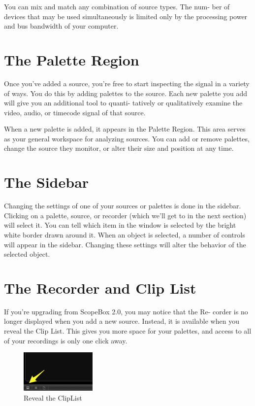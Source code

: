 \documentclass[10,letterpaper,]{report}
\begin{document}
You can mix and match any combination of source types. The num- ber of
devices that may be used simultaneously is limited only by the
processing power and bus bandwidth of your computer.

\section{The Palette Region}

Once you've added a source, you're free to start inspecting the signal
in a variety of ways. You do this by adding palettes to the source. Each
new palette you add will give you an additional tool to quanti- tatively
or qualitatively examine the video, audio, or timecode signal of that
source.

When a new palette is added, it appears in the Palette Region. This area
serves as your general workspace for analyzing sources. You can add or
remove palettes, change the source they monitor, or alter their size and
position at any time.

\section{The Sidebar}

Changing the settings of one of your sources or palettes is done in the
sidebar. Clicking on a palette, source, or recorder (which we'll get to
in the next section) will select it. You can tell which item in the
window is selected by the bright white border drawn around it. When an
object is selected, a number of controls will appear in the sidebar.
Changing these settings will alter the behavior of the selected object.

\section{The Recorder and Clip List}

If you're upgrading from ScopeBox 2.0, you may notice that the Re-
corder is no longer displayed when you add a new source. Instead, it is
available when you reveal the Clip List. This gives you more space for
your palettes, and access to all of your recordings is only one click
away.

\begin{figure}[htbp]
\centering
\includegraphics{images/cliplistToggle.png}
\caption{Reveal the ClipList}
\end{figure}
\end{document}
